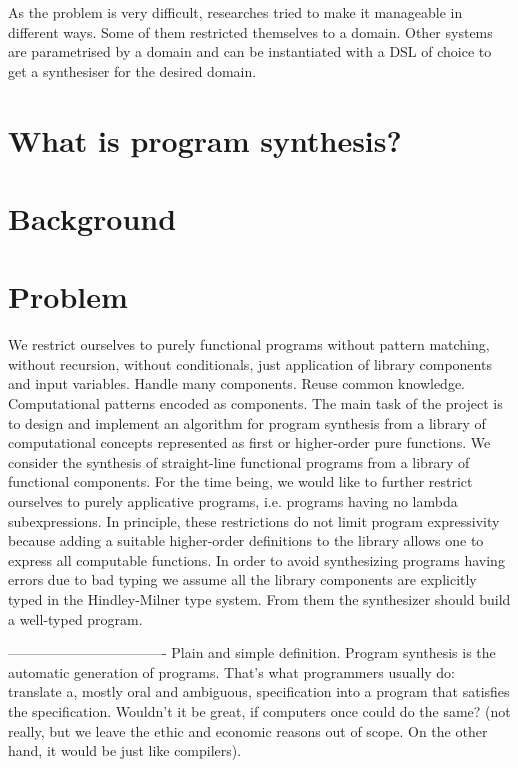 As the problem is very difficult, researches tried to make it manageable in different ways. Some of them \cite{Gulwani:2011:ASP:1926385.1926423, Gulwani:2011:SGC:1993498.1993505} restricted themselves to a domain. Other systems \cite{Perelman:2014:TS:2594291.2594297} are parametrised by a domain and can be instantiated with a DSL of choice to get a synthesiser for the desired domain.




\section{What is program synthesis?}

\section{Background}

\section{Problem}
We restrict ourselves to purely functional programs without pattern matching, without recursion, without conditionals, just application of library components and input variables. Handle many components. Reuse common knowledge. Computational patterns encoded as components.
The main task of the project is to design and implement an algorithm for program synthesis from a library of computational concepts represented as first or higher-order pure functions.
We consider the synthesis of straight-line functional programs from a library of functional components.  For the time being, we would like to further restrict ourselves to purely applicative programs, i.e. programs having no lambda subexpressions. In principle, these restrictions do not limit program expressivity because adding a suitable higher-order definitions to the library allows one to express all computable functions.  In order to avoid synthesizing programs having errors due to bad typing we assume all the library components are explicitly typed in the Hindley-Milner type system.  From them the synthesizer should build a well-typed program.






----------------------------------
Plain and simple definition. Program synthesis is the automatic generation of programs. That's what programmers usually do: translate a, mostly oral and ambiguous, specification into a program that satisfies the specification. Wouldn't it be great, if computers once could do the same? (not really, but we leave the ethic and economic reasons out of scope. On the other hand, it would be just like compilers).

